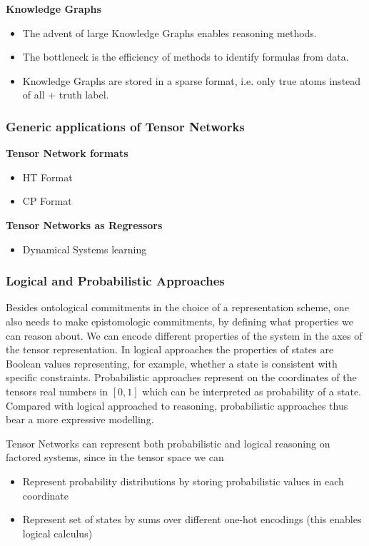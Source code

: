 \textbf{Knowledge Graphs}
\cite{hogan_knowledge_2021}
\begin{itemize}
    \item The advent of large Knowledge Graphs enables reasoning methods.
    \item The bottleneck is the efficiency of methods to identify formulas from data.
    \item Knowledge Graphs are stored in a sparse format, i.e. only true atoms instead of all + truth label.
\end{itemize}

\subsubsection{Generic applications of Tensor Networks}

\textbf{Tensor Network formats}
\begin{itemize}
    \item HT Format \cite{hackbusch_new_2009}
    \item CP Format
\end{itemize}


\textbf{Tensor Networks as Regressors}
\begin{itemize}
    \item Dynamical Systems learning \cite{gels_multidimensional_2019, goesmann_tensor_2020}
\end{itemize}

\subsubsection{Logical and Probabilistic Approaches}

Besides ontological commitments in the choice of a representation scheme, one also needs to make epistomologic commitments, by defining what properties we can reason about.
We can encode different properties of the system in the axes of the tensor representation.
In logical approaches the properties of states are Boolean values representing, for example, whether a state is consistent with specific constraints.
Probabilistic approaches represent on the coordinates of the tensors real numbers in $[0,1]$ which can be interpreted as probability of a state.
Compared with logical approached to reasoning, probabilistic approaches thus bear a more expressive modelling.


Tensor Networks can represent both probabilistic and logical reasoning on factored systems, since in the tensor space we can
\begin{itemize}
    \item Represent probability distributions by storing probabilistic values in each coordinate
    \item Represent set of states by sums over different one-hot encodings (this enables logical calculus)
\end{itemize}

